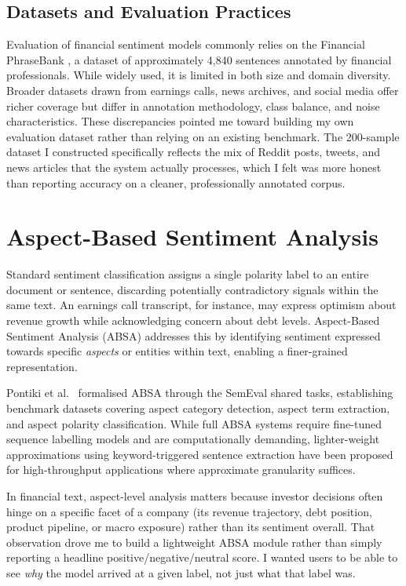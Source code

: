 \subsection*{Datasets and Evaluation Practices}

Evaluation of financial sentiment models commonly relies on the Financial PhraseBank \citep{malo2014financialphrasebank}, a dataset of approximately 4,840 sentences annotated by financial professionals.  While widely used, it is limited in both size and domain diversity.  Broader datasets drawn from earnings calls, news archives, and social media \citep{schumaker2009textmining, smailovic2014predictive} offer richer coverage but differ in annotation methodology, class balance, and noise characteristics.  These discrepancies pointed me toward building my own evaluation dataset rather than relying on an existing benchmark. The 200-sample dataset I constructed specifically reflects the mix of Reddit posts, tweets, and news articles that the system actually processes, which I felt was more honest than reporting accuracy on a cleaner, professionally annotated corpus.

\section{Aspect-Based Sentiment Analysis}

Standard sentiment classification assigns a single polarity label to an entire document or sentence, discarding potentially contradictory signals within the same text.  An earnings call transcript, for instance, may express optimism about revenue growth while acknowledging concern about debt levels.  Aspect-Based Sentiment Analysis (ABSA) \citep{pontiki2014semeval} addresses this by identifying sentiment expressed towards specific \textit{aspects} or entities within text, enabling a finer-grained representation.

Pontiki et al.\ \citep{pontiki2014semeval} formalised ABSA through the SemEval shared tasks, establishing benchmark datasets covering aspect category detection, aspect term extraction, and aspect polarity classification.  While full ABSA systems require fine-tuned sequence labelling models and are computationally demanding, lighter-weight approximations using keyword-triggered sentence extraction have been proposed for high-throughput applications where approximate granularity suffices.

In financial text, aspect-level analysis matters because investor decisions often hinge on a specific facet of a company (its revenue trajectory, debt position, product pipeline, or macro exposure) rather than its sentiment overall. That observation drove me to build a lightweight ABSA module rather than simply reporting a headline positive/negative/neutral score. I wanted users to be able to see \textit{why} the model arrived at a given label, not just what that label was.

